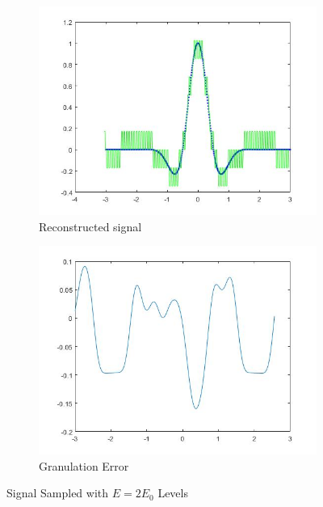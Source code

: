 \documentclass{article}
\begin{document}
\begin{figure}[H]
  \begin{center}
    \begin{subfigure}[b]{0.4\linewidth}
      \includegraphics[width = \linewidth]{Del_2.jpg}
      \caption{Reconstructed signal}
    \end{subfigure}
    \begin{subfigure}[b]{0.4\linewidth}
      \includegraphics[width = \linewidth]{Del_Error_2.jpg}
      \caption{Granulation Error}
    \end{subfigure}
    \caption{Signal Sampled with $E = 2 E_0$ Levels}
    \label{fig:figure5}
  \end{center}
\end{figure}
\appendix
\end{document}
